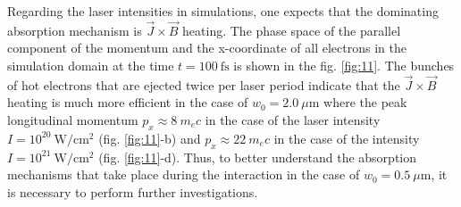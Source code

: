 Regarding the laser intensities in simulations, one expects that the dominating absorption mechanism is $ \vec{J} \times \vec{B} $ heating. The phase space of the parallel component of the momentum and the x-coordinate of all electrons in the simulation domain at the time $ t = 100 \ \mathrm{fs} $ is shown in the fig. \ref{fig:11}. The bunches of hot electrons that are ejected twice per laser period indicate that the $ \vec{J} \times \vec{B} $ heating is much more efficient in the case of $ w_0 = 2.0 \ \mu\mathrm{m} $ where the peak longitudinal momentum $ p_x \approx 8 \ m_{e} c $ in the case of the laser intensity $ I = 10^{20} \ \mathrm{W/cm^2} $ (fig. \ref{fig:11}-b) and $ p_x \approx 22 \ m_{e} c $ in the case of the intensity $ I = 10^{21} \ \mathrm{W/cm^2} $ (fig. \ref{fig:11}-d). Thus, to better understand the absorption mechanisms that take place during the interaction in the case of $ w_0 = 0.5 \ \mu\mathrm{m} $, it is necessary to perform further investigations.

